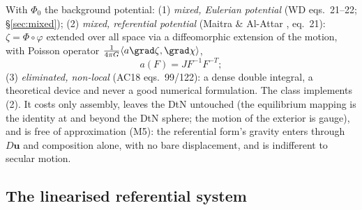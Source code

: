\documentclass[11pt]{article}
\numberwithin{equation}{section}
\theoremstyle{remark}
\newcommand{\vu}{\mathbf{u}}
\begin{document}
With $\Phi_0$ the background potential:
(1) \emph{mixed, Eulerian potential} (WD eqs.~21--22; \S\ref{sec:mixed});
(2) \emph{mixed, referential potential} (Maitra \& Al-Attar
\cite{MaitraAlAttar2024}, eq.~21): $\zeta = \Phi\circ\varphi$ extended over
all space via a diffeomorphic extension of the motion, with Poisson operator
$\frac{1}{4\pi G}\langle a\grad\zeta,\grad\chi\rangle$,
\begin{equation}
  a(F) = J F^{-1}F^{-T};
\end{equation}
(3) \emph{eliminated, non-local} (AC18 eqs.~99/122): a dense double
integral, a theoretical device and never a good numerical formulation. The
class implements (2). It costs only assembly, leaves the DtN untouched (the
equilibrium mapping is the identity at and beyond the DtN sphere; the motion
of the exterior is gauge), and is free of approximation (M5): the referential
form's gravity enters through $D\vu$ and composition alone, with no bare
displacement, and is indifferent to secular motion.

\subsection{The linearised referential system}
\end{document}
